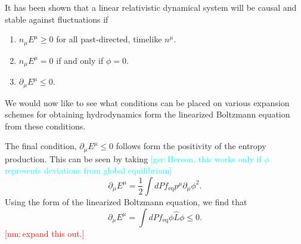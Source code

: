 \documentclass[aps,prd,preprint,nofootinbib,amsmath,amssymb,showpacs,longbibliography,singlecolumn,superscriptaddress,10pt]{revtex4-1}
\theoremstyle{plain}
\theoremstyle{definition}
\newcommand{\nm}[1]{{\textcolor{red}{[nm:\,{#1}]}}}
\newcommand{\gsr}[1]{{\textcolor{cyan}{[gsr:\,{#1}]}}}
\begin{document}
It has been shown \cite{Gavassino:2021kjm} that a linear relativistic dynamical system will be causal and stable against fluctuations if 
\begin{enumerate}
    \item $n_{\mu} E^{\mu} \geq 0$ for all past-directed, timelike $n^{\mu}$. 
    \item $n_{\mu} E^{\mu} = 0$ if and only if $\phi = 0$. 
    \item $\partial_{\mu} E^{\mu} \leq 0$. 
\end{enumerate}
We would now like to see what conditions can be placed on various expansion schemes for obtaining hydrodynamics form the linearized Boltzmann equation from these conditions. 

The final condition, $\partial_{\mu} E^{\mu} \leq 0$ follows form the positivity of the entropy production. This can be seen by taking \gsr{Hereon, this works only if $\phi$ represents deviations from global equilibrium}
\begin{equation}
    \partial_{\mu} E^{\mu} = \frac{1}{2} \int dP f_{\mathrm{eq}} p^{\mu} \partial_{\mu} \phi^2 .
\end{equation}
Using the form of the linearized Boltzmann equation, we find that
\begin{equation}
    \partial_{\mu} E^{\mu} = \int dP f_{\mathrm{eq}} \phi \hat{L} \phi \leq 0 .
\end{equation}
\nm{expand this out.}
\end{document}
